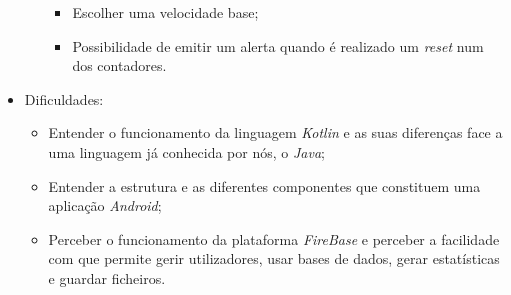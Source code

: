 \documentclass[11pt]{article}
\begin{document}
\begin{itemize}
\begin{itemize}
\begin{itemize}
            \item Escolher uma velocidade base;
            \item Possibilidade de emitir um alerta quando é realizado um \textit{reset} num dos contadores.
        \end{itemize}
    \end{itemize}
    \item Dificuldades:
    \begin{itemize}
        \item Entender o funcionamento da linguagem \textit{Kotlin} e as suas diferenças face a uma linguagem já conhecida por nós, o \textit{Java};
        \item Entender a estrutura e as diferentes componentes que constituem uma aplicação \textit{Android};
        \item Perceber o funcionamento da plataforma \textit{FireBase} e perceber a facilidade com que permite gerir utilizadores, usar bases de dados, gerar estatísticas e guardar ficheiros.
    \end{itemize}
\end{itemize}

\end{document}
